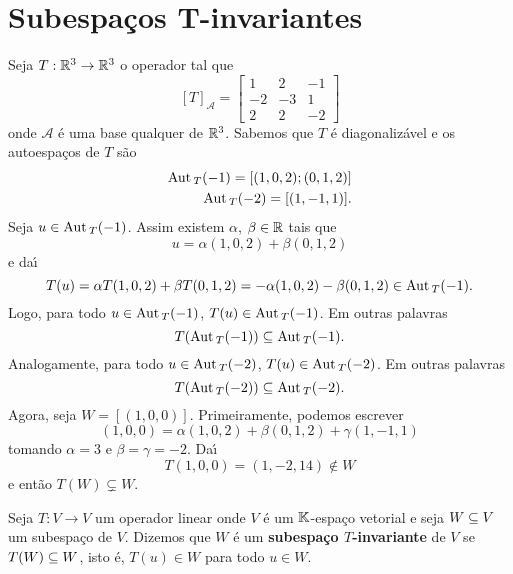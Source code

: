 \section{Subespa\c{c}os T-invariantes} %
\label{sec:subespacos_T-invariantes}
Seja $T : \mathbb{R}^3 \to \mathbb{R}^3$ o operador tal que
		\[
	[T]_\mathcal{A} = \begin{bmatrix}
			1 & 2 & -1\\
			-2 & -3 & 1\\
			2 & 2 & -2
		\end{bmatrix}
		\]
onde $\mathcal{A}$ \'e uma base qualquer de $\mathbb{R}^3$. Sabemos que $T$ \'e diagonaliz\'avel e os autoespa\c{c}os de $T$ s\~ao
\begin{align*}
	{\rm Aut\,}_T(-1) = [(1,0,2); (0,1,2)]\\
	{\rm Aut\,}_T(-2) = [(1,-1,1)].
\end{align*}
Seja $u \in {\rm Aut\,}_T(-1)$. Assim existem $\alpha$, $\beta \in \mathbb{R}$ tais que
\[
	u = \alpha(1,0,2) + \beta(0,1,2)
\]
e da{\'\i}
\[
	T(u) = \alpha T(1,0,2) + \beta T(0,1,2) = -\alpha(1,0,2) - \beta(0,1,2) \in {\rm Aut\,}_T(-1).
\]
Logo, para todo $u \in {\rm Aut\,}_T(-1)$, $T(u) \in {\rm Aut\,}_T(-1)$. Em outras palavras
\[
	T({\rm Aut\,}_T(-1)) \subseteq {\rm Aut\,}_T(-1).
\]
Analogamente, para todo $u \in {\rm Aut\,}_T(-2)$, $T(u) \in {\rm Aut\,}_T(-2)$. Em outras palavras
\[
	T({\rm Aut\,}_T(-2)) \subseteq {\rm Aut\,}_T(-2).
\]
Agora, seja $W = [(1,0,0)]$. Primeiramente, podemos escrever
\[
	(1,0,0) = \alpha(1,0,2) + \beta(0,1,2) + \gamma(1,-1,1)
\]
tomando $\alpha = 3$ e $\beta = \gamma = -2$. Da{\'\i}
\[
	T(1,0,0) = (1,-2,14) \notin W
\]
e ent\~ao $T(W) \varsubsetneq W$.

\begin{definicao}
	Seja $T : V \to V$ um operador linear onde $V$ \'e um $\mathbb{K}$-espa\c{c}o vetorial e seja $W \subseteq V$ um subespa\c{c}o de $V$. Dizemos que $W$ \'e um \textbf{subespa\c{c}o $T$-invariante} de $V$ se $T(W) \subseteq W$, isto \'e, $T(u) \in W$ para todo $u \in W$.
\end{definicao}

